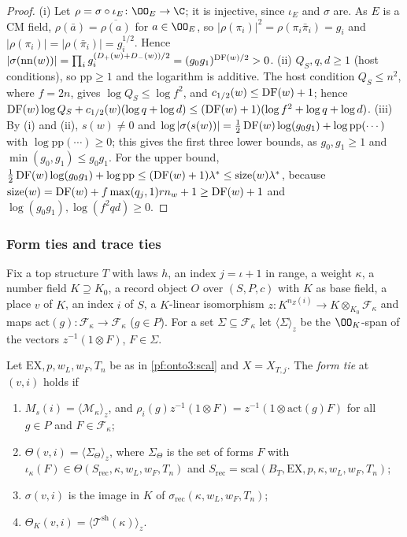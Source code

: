 \begin{proof}
(i) Let $\rho=\sigma\circ\iota_E\colon\OO_E\to\C$; it is injective, since $\iota_E$ and $\sigma$ are. As $E$ is a CM
field, $\rho(\bar a)=\overline{\rho(a)}$ for $a\in\OO_E$, so $|\rho(\pi_i)|^2=\rho(\pi_i\bar\pi_i)=g_i$ and
$|\rho(\pi_i)|=|\rho(\bar\pi_i)|=g_i^{1/2}$. Hence $|\sigma(\mathrm{nn}(w))|=\prod_ig_i^{(D_+(w)+D_-(w))/2}=
(g_0g_1)^{\operatorname{DF}(w)/2}>0$. (ii) $Q_S,q,d\ge1$ (host conditions), so $\mathrm{pp}\ge1$ and the logarithm is
additive. The host condition $Q_S\le n^2$, where $f=2n$, gives $\log Q_S\le\log f^2$, and
$c_{1/2}(w)\le\operatorname{DF}(w)+1$; hence $\operatorname{DF}(w)\log Q_S+c_{1/2}(w)(\log q+\log d)\le(\operatorname{DF}(w)+1)
(\log f^2+\log q+\log d)$. (iii) By (i) and (ii), $s(w)\ne0$ and $\log|\sigma(s(w))|=\frac12\operatorname{DF}(w)
\log(g_0g_1)+\log\mathrm{pp}(\cdots)$ with $\log\mathrm{pp}(\cdots)\ge0$; this gives the first three lower bounds, as
$g_0,g_1\ge1$ and $\min(g_0,g_1)\le g_0g_1$. For the upper bound, $\frac12\operatorname{DF}(w)\log(g_0g_1)+\log\mathrm{pp}
\le(\operatorname{DF}(w)+1)\lambda^*\le\operatorname{size}(w)\lambda^*$, because $\operatorname{size}(w)=\operatorname{DF}(w)+
f\max(q_j,1)rn_w+1\ge\operatorname{DF}(w)+1$ and $\log(g_0g_1),\log(f^2qd)\ge0$.
\end{proof}

\subsubsection{Form ties and trace ties}

Fix a top structure $T$ with laws $h$, an index $j=\iota+1$ in range, a weight $\kappa$, a number field $K\supseteq
K_0$, a record object $O$ over $(S,P,c)$ with $K$ as base field, a place $v$ of $K$, an index $i$ of $S$, a
$K$-linear isomorphism $z\colon K^{n_Z(i)}\to K\otimes_{K_0}\mathcal F_\kappa$ and maps $\mathrm{act}(g)\colon
\mathcal F_\kappa\to\mathcal F_\kappa$ ($g\in P$). For a set $\Sigma\subseteq\mathcal F_\kappa$ let $\langle\Sigma
\rangle_z$ be the $\OO_K$-span of the vectors $z^{-1}(1\otimes F)$, $F\in\Sigma$.

\begin{definition}\label{pf:onto3:formtie}
Let $\mathrm{EX},p,w_L,w_F,T_n$ be as in \cref{pf:onto3:scal} and $X=X_{T,j}$. The \emph{form tie} at $(v,i)$ holds if
\begin{enumerate}[label=(\roman*)]
\item $M_s(i)=\langle\mathcal M_\kappa\rangle_z$, and $\rho_i(g)z^{-1}(1\otimes F)=z^{-1}(1\otimes\mathrm{act}(g)F)$
for all $g\in P$ and $F\in\mathcal F_\kappa$;
\item $\Theta(v,i)=\langle\Sigma_\Theta\rangle_z$, where $\Sigma_\Theta$ is the set of forms $F$ with $\iota_\kappa(F)\in
\Theta(S_{\mathrm{rec}},\kappa,w_L,w_F,T_n)$ and $S_{\mathrm{rec}}=\mathrm{scal}(B_T,\mathrm{EX},p,\kappa,w_L,w_F,T_n)$;
\item $\sigma(v,i)$ is the image in $K$ of $\sigma_{\mathrm{rec}}(\kappa,w_L,w_F,T_n)$;
\item $\Theta_K(v,i)=\langle\mathcal T^{\mathrm{sh}}(\kappa)\rangle_z$.
\end{enumerate}
\end{definition}

